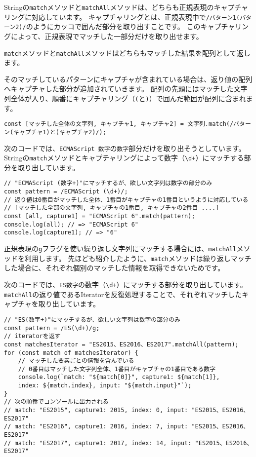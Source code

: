 Stringの\texttt{match}メソッドと\texttt{matchAll}メソッドは、どちらも正規表現のキャプチャリングに対応しています。
キャプチャリングとは、正規表現中で\texttt{/パターン1(パターン2)/}のようにカッコで囲んだ部分を取り出すことです。
このキャプチャリングによって、正規表現でマッチした一部分だけを取り出せます。

\texttt{match}メソッドと\texttt{matchAll}メソッドはどちらもマッチした結果を配列として返します。

そのマッチしているパターンにキャプチャが含まれている場合は、返り値の配列へキャプチャした部分が追加されていきます。
配列の先頭にはマッチした文字列全体が入り、順番にキャプチャリング（\texttt{(}と\texttt{)}）で囲んだ範囲が配列に含まれます。

\begin{lstlisting}
const [マッチした全体の文字列, キャプチャ1, キャプチャ2] = 文字列.match(/パターン(キャプチャ1)と(キャプチャ2)/);
\end{lstlisting}

次のコードでは、\texttt{ECMAScript 数字}の\texttt{数字}部分だけを取り出そうとしています。
Stringの\texttt{match}メソッドとキャプチャリングによって数字（\texttt{\textbackslash d+}）にマッチする部分を取り出しています。

\begin{lstlisting}
// "ECMAScript (数字+)"にマッチするが、欲しい文字列は数字の部分のみ
const pattern = /ECMAScript (\d+)/;
// 返り値は0番目がマッチした全体、1番目がキャプチャの1番目というように対応している
// [マッチした全部の文字列, キャプチャの1番目, キャプチャの2番目 ....]
const [all, capture1] = "ECMAScript 6".match(pattern);
console.log(all); // => "ECMAScript 6"
console.log(capture1); // => "6"
\end{lstlisting}

正規表現の\texttt{g}フラグを使い繰り返し文字列にマッチする場合には、\texttt{matchAll}メソッドを利用します。
先ほども紹介したように、\texttt{match}メソッドは繰り返しマッチした場合に、それぞれ個別のマッチした情報を取得できないためです。

次のコードでは、\texttt{ES数字}の数字（\texttt{\textbackslash d+}）にマッチする部分を取り出しています。
\texttt{matchAll}の返り値であるIteratorを反復処理することで、それぞれマッチしたキャプチャを取り出しています。

\begin{lstlisting}
// "ES(数字+)"にマッチするが、欲しい文字列は数字の部分のみ
const pattern = /ES(\d+)/g;
// iteratorを返す
const matchesIterator = "ES2015、ES2016、ES2017".matchAll(pattern);
for (const match of matchesIterator) {
    // マッチした要素ごとの情報を含んでいる
    // 0番目はマッチした文字列全体、1番目がキャプチャの1番目である数字
    console.log(`match: "${match[0]}", capture1: ${match[1]}, 
    index: ${match.index}, input: "${match.input}"`);
}
// 次の順番でコンソールに出力される
// match: "ES2015", capture1: 2015, index: 0, input: "ES2015、ES2016、ES2017"
// match: "ES2016", capture1: 2016, index: 7, input: "ES2015、ES2016、ES2017"
// match: "ES2017", capture1: 2017, index: 14, input: "ES2015、ES2016、ES2017"
\end{lstlisting}

